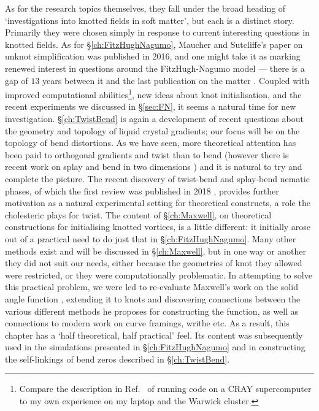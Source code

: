 As for the research topics themselves, they fall under the broad heading of `investigations into knotted fields in soft matter', but each is a distinct story. Primarily they were chosen simply in response to current interesting questions in knotted fields. As for \S\ref{ch:FitzHughNagumo}, Maucher and Sutcliffe's paper on unknot simplification \citep{Maucher2016} was published in 2016, and one might take it as marking renewed interest in questions around the FitzHugh-Nagumo model --- there is a gap of $13$ years between it and the last publication on the matter \citep{Sutcliffe2003}. Coupled with improved computational abilities\footnote{Compare the description in Ref.~\citep{Henze1993} of running code on a CRAY supercomputer to my own experience on my laptop and the Warwick cluster.}, new ideas about knot initialisation, and the recent experiments we discussed in \S \ref{sec:FN}, it seems a natural time for new investigation. \S\ref{ch:TwistBend} is again a development of recent questions about the geometry and topology of liquid crystal gradients; our focus will be on the topology of bend distortions. As we have seen, more theoretical attention has been paid to orthogonal gradients and twist \citep{Bellar2014,Machon2016, Machon2017} than to bend (however there is recent work on splay and bend in two dimensions \citep{Niv2018}) and it is natural to try and complete the picture. The recent discovery of twist-bend and splay-bend nematic phases, of which the first review was published in 2018 \citep{Lavrentovich2018}, provides further motivation as a natural experimental setting for theoretical constructs, a role the cholesteric plays for twist. The content of \S \ref{ch:Maxwell}, on theoretical constructions for initialising knotted vortices, is a little different: it initially arose out of a practical need to do just that in \S\ref{ch:FitzHughNagumo}. Many other methods exist and will be discussed in \S\ref{ch:Maxwell}, but in one way or another they did not suit our needs, either because the geometries of knot they allowed were restricted, or they were computationally problematic. In attempting to solve this practical problem, we were led to re-evaluate Maxwell's work on the solid angle function \citep{Maxwell2}, extending it to knots and discovering connections between the various different methods he proposes for constructing the function, as well as connections to modern work on curve framings, writhe etc. As a result, this chapter has a `half theoretical, half practical' feel. Its content was subsequently used in the simulations presented in \S\ref{ch:FitzHughNagumo} and in constructing the self-linkings of bend zeros described in \S\ref{ch:TwistBend}.

